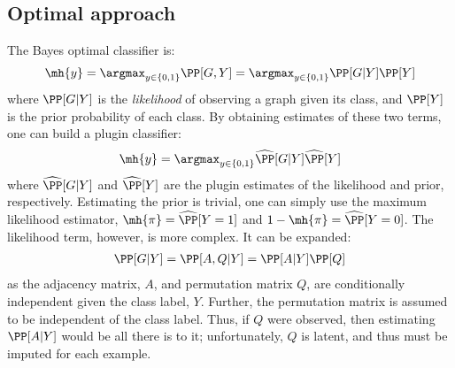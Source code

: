 \subsection{Optimal approach} %
\label{sec:lik}

The Bayes optimal classifier is:
\begin{align}
	\mh{y} = \argmax_{y \in \{0,1\}} \PP[G,Y] = \argmax_{y \in \{0,1\}} \PP[G | Y] \PP[Y]
\end{align}
where $\PP[G|Y]$ is the \emph{likelihood} of observing a graph given its class, and $\PP[Y]$ is the prior probability of each class.  By obtaining estimates of these two terms, one can build a plugin classifier:
\begin{align}
	\mh{y} = \argmax_{y \in \{0,1\}} \mhP[G | Y] \mhP[Y]	
\end{align}
where $\mhP[G|Y]$ and $\mhP[Y]$ are the plugin estimates of the likelihood and prior, respectively.  Estimating the prior is trivial, one can simply use the maximum likelihood estimator, $\mh{\pi}=\mhP[Y=1]$ and $1-\mh{\pi}=\mhP[Y=0]$.  The likelihood term, however, is more complex.  It can be expanded:
\begin{align}
	\PP[G|Y] = \PP[A,Q | Y] = \PP[A | Y] \PP[Q]
\end{align}
as the adjacency matrix, $A$, and permutation matrix $Q$, are conditionally independent given the class label, $Y$.  Further, the permutation matrix is assumed to be independent of the class label.  Thus, if $Q$ were observed, then estimating $\PP[A|Y]$ would be all there is to it; unfortunately, $Q$ is latent, and thus must be imputed for each example.  

